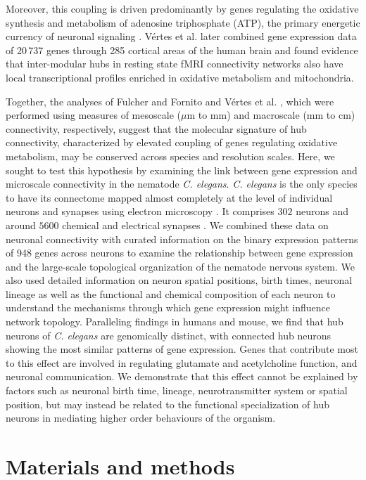 Moreover, this coupling is driven predominantly by genes regulating the oxidative synthesis and metabolism of adenosine triphosphate (ATP), the primary energetic currency of neuronal signaling \citep{Lennie2003, Laughlin2003}. V\'ertes et al. \citep{Vertes2016b} later combined gene expression data of 20\,737 genes through 285 cortical areas of the human brain and found evidence that inter-modular hubs in resting state fMRI connectivity networks also have local transcriptional profiles enriched in oxidative metabolism and mitochondria.

Together, the analyses of Fulcher and Fornito \citep{Fulcher2016} and V\'ertes et al. \citep{Vertes2016b}, which were performed using measures of mesoscale ($\mu$m to mm) and macroscale (mm to cm) connectivity, respectively, suggest that the molecular signature of hub connectivity, characterized by elevated coupling of genes regulating oxidative metabolism, may be conserved across species and resolution scales.
Here, we sought to test this hypothesis by examining the link between gene expression and microscale connectivity in the nematode \emph{C. elegans}.
\emph{C. elegans} is the only species to have its connectome mapped almost completely at the level of individual neurons and synapses using electron microscopy \citep{White1986, Varshney2011}.
It comprises $302$ neurons and around $5600$ chemical and electrical synapses \citep{White1986}.
We combined these data on neuronal connectivity with curated information on the binary expression patterns of 948 genes across neurons to examine the relationship between gene expression and the large-scale topological organization of the nematode nervous system.
We also used detailed information on neuron spatial positions, birth times, neuronal lineage as well as the functional and chemical composition of each neuron to understand the mechanisms through which gene expression might influence network topology.
Paralleling findings in humans and mouse, we find that hub neurons of \emph{C. elegans} are genomically distinct, with connected hub neurons showing the most similar patterns of gene expression.
Genes that contribute most to this effect are involved in regulating glutamate and acetylcholine function, and neuronal communication.
We demonstrate that this effect cannot be explained by factors such as neuronal birth time, lineage, neurotransmitter system or spatial position, but may instead be related to the functional specialization of hub neurons in mediating higher order behaviours of the organism.

\section{Materials and methods}

